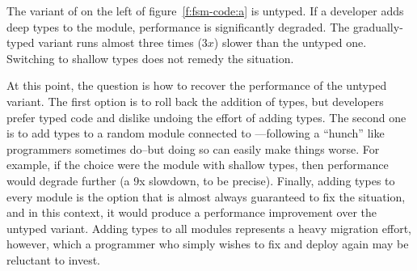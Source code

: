 The variant of  on the left of figure~\ref{f:fsm-code:a} is untyped.
If a developer adds deep types to the  module, performance is
significantly degraded. The gradually-typed variant runs almost three times
($3x$) slower than the untyped one.  Switching to shallow types does not remedy
the situation. 


At this point, the question is how to recover the performance of the untyped
variant. The first option is to roll back the addition of types, but developers
prefer typed code and dislike undoing the effort of adding types. The second one
is to add types to a random module connected to ---following a
``hunch'' like programmers sometimes do--but doing so can easily make things
worse. For example, if the choice were the  module with shallow
types, then performance would degrade further (a 9x slowdown, to be
precise). Finally, adding types to every module is the option that is almost
always guaranteed to fix the situation, and in this context, it would produce a
performance improvement over the untyped variant.  Adding types to all modules
represents a heavy migration effort, however, which a programmer who simply
wishes to fix  and deploy again may be reluctant to invest.


